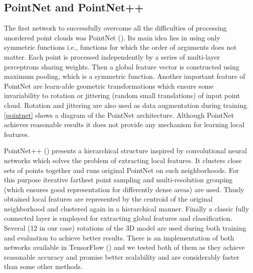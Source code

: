 \subsection{PointNet and PointNet++}
The first network to successfully overcome all the difficulties of processing unordered point clouds was PointNet (\cite{qi_pointnet:_2016}). Its main idea lies in using only symmetric functions i.e., functions for which the order of arguments does not matter. Each point is processed independently by a series of multi-layer perceptrons sharing weights. Then a global feature vector is constructed using maximum pooling, which is a symmetric function. Another important feature of PointNet are learn-able geometric transformations which ensure some invariability to rotation or jittering (random small translations) of input point cloud. Rotation and jittering are also used as data augmentation during training. \autoref{pointnet} shows a diagram of the PointNet architecture.
Although PointNet achieves reasonable results it does not provide any mechanism for learning local features.\par 
PointNet++ (\cite{qi_pointnet++:_2017}) presents a hierarchical structure inspired by convolutional neural networks which solves the problem of extracting local features. It clusters close sets of points together and runs original PointNet on such neighborhoods. For this purpose iterative farthest point sampling and multi-resolution grouping (which ensures good representation for differently dense areas) are used. Thusly obtained local features are represented by the centroid of the original neighborhood and clustered again in a hierarchical manner. Finally a classic fully connected layer is employed for extracting global features and classification.
Several (12 in our case) rotations of the 3D model are used during both training and evaluation to achieve better results. There is an implementation of both networks available in TensorFlow (\cite{qi_pointnet_2016, qi_pointnet++_2017}) and we tested both of them as they achieve reasonable accuracy and promise better scalability and are considerably faster than some other methods.



